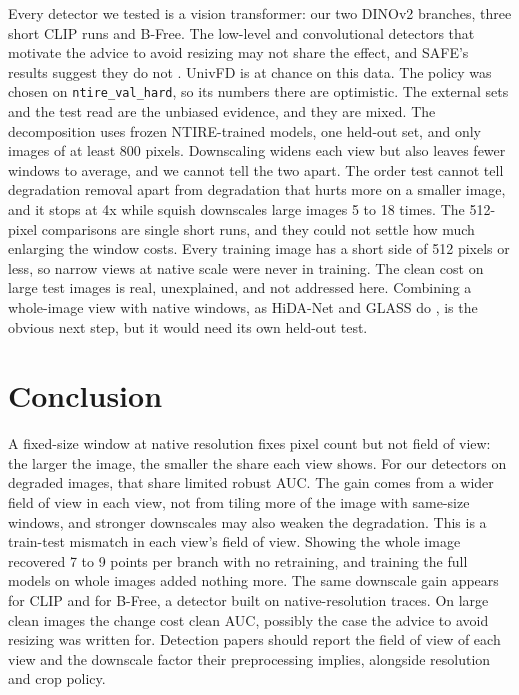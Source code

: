 \documentclass[letterpaper]{article} %
\begin{document}
Every detector we tested is a vision transformer: our two DINOv2 branches,
three short CLIP runs and B-Free. The low-level and convolutional detectors
that motivate the advice to avoid resizing may not share the effect, and
SAFE's results suggest they do not \cite{li2025safe}. UnivFD is at chance on
this data. The policy was chosen on \texttt{ntire\_val\_hard}, so its numbers
there are optimistic. The external sets and the test read are the unbiased
evidence, and they are mixed. The decomposition uses frozen NTIRE-trained
models, one held-out set, and only images of at least 800 pixels. Downscaling
widens each view but also leaves fewer windows to average, and we cannot tell
the two apart. The order test cannot tell degradation removal apart from
degradation that hurts more on a smaller image, and it stops at 4x while
squish downscales large images 5 to 18 times. The 512-pixel comparisons are
single short runs, and they could not settle how much enlarging the window
costs. Every training image has a short side of 512 pixels or less, so narrow
views at native scale were never in training. The clean cost on large test
images is real, unexplained, and not addressed here. Combining a whole-image
view with native windows, as HiDA-Net and GLASS do
\cite{mu2026hidanet,han2026glass}, is the obvious next step, but it would need
its own held-out test.

\section{Conclusion}

A fixed-size window at native resolution fixes pixel count but not field of
view: the larger the image, the smaller the share each view shows. For our
detectors on degraded images, that share limited robust AUC. The gain comes
from a wider field of view in each view, not from tiling more of the image
with same-size windows, and stronger downscales may also weaken the
degradation. This is a train-test mismatch in each view's field of view.
Showing the whole image recovered 7 to 9 points per branch with no
retraining, and training the full models on whole images added nothing more.
The same downscale gain appears for CLIP and for B-Free, a detector built on
native-resolution traces. On large clean images the change cost clean AUC,
possibly the case the advice to avoid resizing was written for. Detection
papers should report the field of view of each view and the downscale factor
their preprocessing implies, alongside resolution and crop policy.


\end{document}
